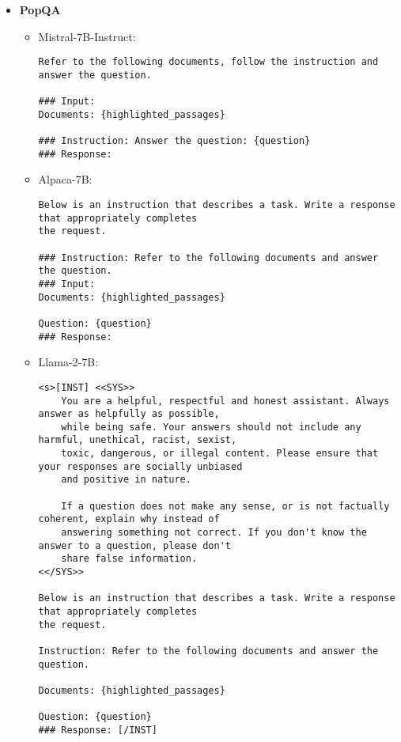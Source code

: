 \begin{itemize}
\begin{itemize}
\begin{lstlisting}[basicstyle=\small\ttfamily,breaklines=true]
### Response:  
        \end{lstlisting}
    \end{itemize}

    \item \textbf{PopQA}
    \begin{itemize}
        \item Mistral-7B-Instruct:
        \begin{lstlisting}[basicstyle=\small\ttfamily,breaklines=true]
Refer to the following documents, follow the instruction and answer the question.

### Input:
Documents: {highlighted_passages}

### Instruction: Answer the question: {question}
### Response:
        \end{lstlisting}        
        \item Alpaca-7B:
        \begin{lstlisting}[basicstyle=\small\ttfamily,breaklines=true]
Below is an instruction that describes a task. Write a response that appropriately completes
the request.

### Instruction: Refer to the following documents and answer the question.
### Input:
Documents: {highlighted_passages}

Question: {question}
### Response: 
        \end{lstlisting}
        \item Llama-2-7B:
        \begin{lstlisting}[basicstyle=\small\ttfamily,breaklines=true]
<s>[INST] <<SYS>>
    You are a helpful, respectful and honest assistant. Always answer as helpfully as possible,
    while being safe. Your answers should not include any harmful, unethical, racist, sexist,
    toxic, dangerous, or illegal content. Please ensure that your responses are socially unbiased
    and positive in nature.

    If a question does not make any sense, or is not factually coherent, explain why instead of
    answering something not correct. If you don't know the answer to a question, please don't
    share false information.
<</SYS>>

Below is an instruction that describes a task. Write a response that appropriately completes
the request.

Instruction: Refer to the following documents and answer the question.

Documents: {highlighted_passages}

Question: {question}
### Response: [/INST]
        \end{lstlisting}
    \end{itemize}
    

\end{itemize}
